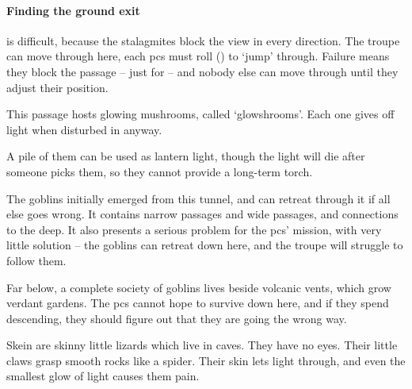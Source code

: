 \begin{multicols}{2}
\paragraph{Finding the ground exit}
is difficult, because the stalagmites block the view in every direction.
The troupe can move through here, each \glspl{pc} must roll  (\tn[10]) to `jump' through.
Failure means they block the passage -- just for  -- and nobody else can move through until they adjust their position.




This passage hosts glowing mushrooms, called `\glspl{glowshroom}'.
Each one gives off light when disturbed in anyway.

A pile of them can be used as lantern light, though the light will die after  someone picks them, so they cannot provide a long-term torch.




The goblins initially emerged from this tunnel, and can retreat through it if all else goes wrong.
It contains narrow passages and wide passages, and connections to the \gls{deep}.
It also presents a serious problem for the \glspl{pc}' mission, with very little solution -- the goblins can retreat down here, and the troupe will struggle to follow them.

Far below, a complete society of goblins lives beside volcanic vents, which grow verdant gardens.
The \glspl{pc} cannot hope to survive down here, and if they spend  descending, they should figure out that they are going the wrong way.

\playCommentaryRestI[t]


\begin{exampletext}
  Skein are skinny little lizards which live in caves.
  They have no eyes.
  Their little claws grasp smooth rocks like a spider.
  Their skin lets light through, and even the smallest glow of light causes them pain.
\end{exampletext}


\end{multicols}
